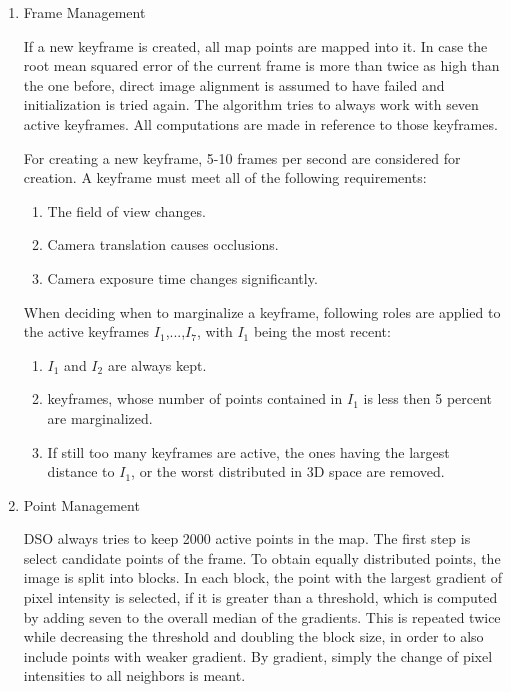 	\begin{enumerate}
	\item{Frame Management}
	
	If a new keyframe is created, all map points are mapped into it. In case the root mean squared error of the current frame is more than twice as high than the one before, 
	direct image alignment is assumed to have failed and initialization is tried again. The algorithm tries to always work with seven active keyframes. All computations are 
	made in reference to those keyframes. 
	
	For creating a new keyframe, 5-10 frames per second are considered for creation. A keyframe must meet all of the following requirements: 
	
	\begin{enumerate}
	\item{}
	The field of view changes.
	\item{}
	Camera translation causes occlusions. %
	\item{}
	Camera exposure time changes significantly. 
	\end{enumerate}
	
	When deciding when to marginalize a keyframe, following roles are applied to the active keyframes $I_1$,...,$I_7$, with $I_1$ being the most recent: 
	
	\begin{enumerate}
	\item{}
	$I_1$ and $I_2$ are always kept.
	\item{}
	keyframes, whose number of points contained in $I_1$ is less then 5 percent are marginalized.
	\item{}
	If still too many keyframes are active, the ones having the largest distance to $I_1$, or the worst distributed in 3D space are removed. 
	\end{enumerate}
	
	\item{Point Management}
	
	DSO always tries to keep 2000 active points in the map. The first step is select candidate points of the frame. To obtain equally 
	distributed points, the image is split into blocks. In each block, the point with the largest gradient of pixel intensity is selected, if 
	it is greater than a threshold, which is computed by adding seven to the overall median of the gradients. This is repeated twice while 
	decreasing the threshold and doubling the block size, in order to also include points with weaker gradient. 
	By gradient, simply the change of pixel intensities to all neighbors is meant. 
	

\end{enumerate}
